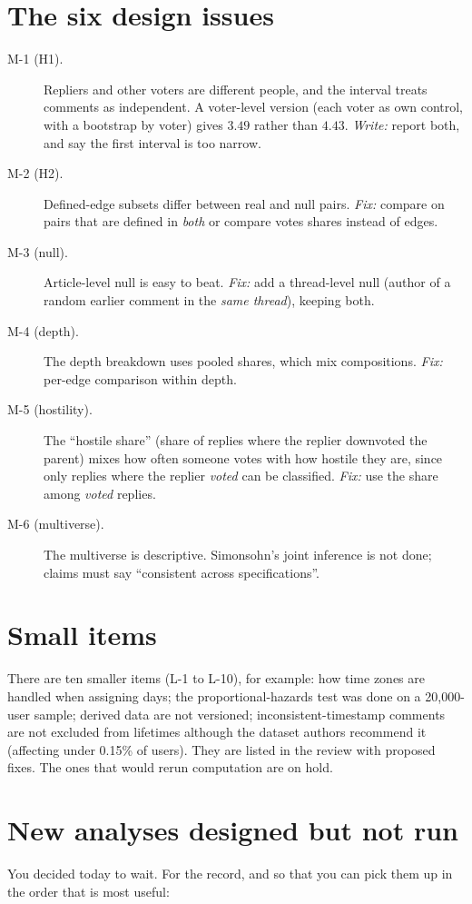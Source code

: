 \section{The six design issues}
\begin{description}
  \item[M-1 (H1).] Repliers and other voters are different people, and the interval treats comments as independent. A voter-level version (each voter as own control, with a bootstrap by voter) gives $3.49$ rather than $4.43$. \emph{Write:} report both, and say the first interval is too narrow.
  \item[M-2 (H2).] Defined-edge subsets differ between real and null pairs. \emph{Fix:} compare on pairs that are defined in \emph{both} or compare votes shares instead of edges.
  \item[M-3 (null).] Article-level null is easy to beat. \emph{Fix:} add a thread-level null (author of a random earlier comment in the \emph{same thread}), keeping both.
  \item[M-4 (depth).] The depth breakdown uses pooled shares, which mix compositions. \emph{Fix:} per-edge comparison within depth.
  \item[M-5 (hostility).] The ``hostile share'' (share of replies where the replier downvoted the parent) mixes how often someone votes with how hostile they are, since only replies where the replier \emph{voted} can be classified. \emph{Fix:} use the share among \emph{voted} replies.
  \item[M-6 (multiverse).] The multiverse is descriptive. Simonsohn's joint inference is not done; claims must say ``consistent across specifications''.
\end{description}

\section{Small items}
There are ten smaller items (L-1 to L-10), for example: how time zones are handled when assigning days; the proportional-hazards test was done on a 20,000-user sample; derived data are not versioned; inconsistent-timestamp comments are not excluded from lifetimes although the dataset authors recommend it (affecting under 0.15\% of users). They are listed in the review with proposed fixes. The ones that would rerun computation are on hold.

\section{New analyses designed but not run}
You decided today to wait. For the record, and so that you can pick them up in the order that is most useful:

